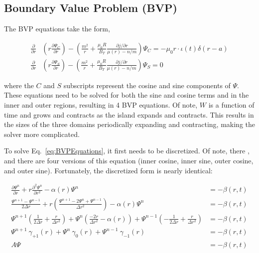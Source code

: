 \documentclass{article}
\begin{document}
\subsection{Boundary Value Problem (BVP)}


The BVP equations take the form,


\begin{equation} \label{eq:BVPEquations}
\begin{split}
\frac{\partial}{\partial r} &  \left( r \frac{\partial \Psi_C}{\partial r} \right)-\left( \frac{m^2}{r} +\frac{\mu_0 R}{B_T} \frac{\partial j / \partial r}{\mu(r)-n/m} \right) \Psi_C  = - \mu_0r \cdot \iota(t) \delta (r-a)  \\
 \frac{\partial}{\partial r} &  \left( r \frac{\partial \Psi_S}{\partial r} \right)-\left( \frac{m^2}{r} +\frac{\mu_0 R}{B_T} \frac{\partial j / \partial r}{\mu(r)-n/m} \right) \Psi_S =0
\end{split}
\end{equation}

\noindent where the $C$ and $S$ subscripts represent the cosine and sine components of $\Psi$.  These equations need to be solved for both the sine and cosine terms and in the inner and outer regions, resulting in 4 BVP equations.  Of note, $W$ is a function of time and grows and contracts as the island expands and contracts.  This results in the sizes of the three domains periodically expanding and contracting, making the solver more complicated.   

To solve Eq.~\ref{eq:BVPEquations}, it first needs to be discretized.  Of note, there , and there are four versions of this equation (inner cosine, inner sine, outer cosine, and outer sine).  Fortunately, the discretized form is nearly identical:


\begin{equation} \label{eq:BVPSolved}
\begin{split}
 \frac{\partial \Psi^n}{\partial r} + r \frac{\partial^2 \Psi^n}{\partial r^2} -\alpha(r)  \Psi^n  & = - \beta(r,t) \\ 
 \frac{\Psi^{n+1}-\Psi^{n-1}}{2\Delta r}+r\left(\frac{\Psi^{n+1}-2\Psi^{n}+\Psi^{n-1}}{\Delta r^2}\right)-\alpha(r)\Psi^n & = - \beta(r,t)  \\
  \Psi^{n+1}\left(\frac{1}{2 \Delta r}+\frac{r}{\Delta r^2 }\right) + \Psi^n\left( \frac{-2r}{\Delta r^2} -\alpha(r) \right) + \Psi^{n-1}\left(-\frac{1}{2\Delta r} + \frac{r}{\Delta r^2} \right) & = - \beta(r,t) \\
  \Psi^{n+1} \ \gamma_{+1}(r) + \Psi^n \ \gamma_{0}(r) + \Psi^{n-1} \ \gamma_{-1}(r) & = - \beta(r,t) \\
A \Psi & = -\beta(r,t) \\
\end{split}
\end{equation}
\end{document}
